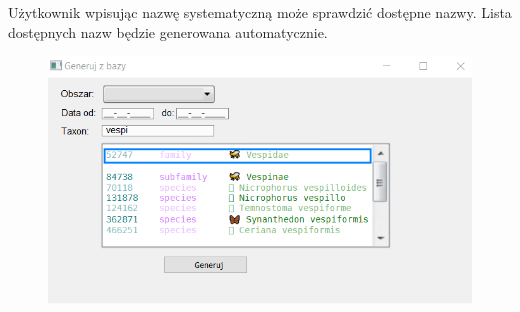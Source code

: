 \documentclass{article}
\begin{document}
Użytkownik wpisując nazwę systematyczną może sprawdzić dostępne nazwy. Lista dostępnych nazw będzie generowana automatycznie.
\begin{figure}[h] 
\begin{center}
\includegraphics[scale = 1]{"gzb1.png"}
\end{center}
\label{}
\end{figure}
\end{document}
